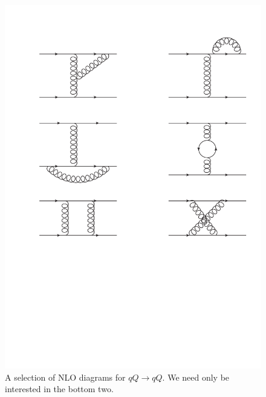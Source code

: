 \begin{figure}[t]
\centering
\includegraphics[scale=0.8]{Images/qQ_nlo.pdf} 
\caption{A selection of NLO diagrams for $qQ \to qQ$. We need only be interested in the bottom two.}
\label{fig:qQnlo}
\end{figure}

